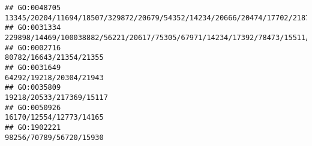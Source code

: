 \documentclass[
]{article}
\begin{document}
\begin{verbatim}
## GO:0048705                                                                                                                                                                                                                                                                                                                  13345/20204/11694/18507/329872/20679/54352/14234/20666/20474/17702/218772/15117/22337/21380
## GO:0031334                                                                                                                                                                                                                                                                                                                          229898/14469/100038882/56221/20617/75305/67971/14234/17392/78473/15511/193740/12229
## GO:0002716                                                                                                                                                                                                                                                                                                                                                                                      80782/16643/21354/21355
## GO:0031649                                                                                                                                                                                                                                                                                                                                                                                      64292/19218/20304/21943
## GO:0035809                                                                                                                                                                                                                                                                                                                                                                                     19218/20533/217369/15117
## GO:0050926                                                                                                                                                                                                                                                                                                                                                                                      16170/12554/12773/14165
## GO:1902221                                                                                                                                                                                                                                                                                                                                                                                      98256/70789/56720/15930

\end{verbatim}
\end{document}

